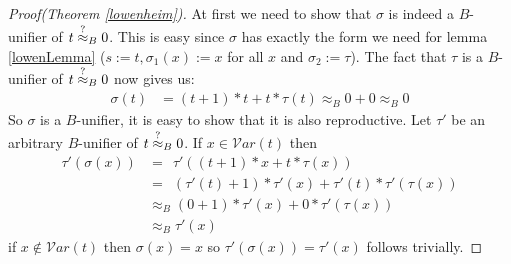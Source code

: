 		\begin{proof}[Proof(Theorem \ref{lowenheim})]
		At first we need to show that $\sigma$ is indeed a $B$-unifier of $t\stackrel{?}{\approx}_B0$. This is easy since $\sigma$ has exactly the form we need for lemma \ref{lowenLemma} ($s:=t,\sigma_1(x):=x$ for all $x$ and $\sigma_2:=\tau$). The fact that $\tau$ is a $B$-unifier of $t\stackrel{?}{\approx}_B0$ now gives us:
		\begin{align*}
		\sigma(t)&=(t+1)*t+t*\tau(t)
		\approx_B0+0
		\approx_B0
		\end{align*}
		So $\sigma$ is a $B$-unifier, it is easy to show that it is also reproductive. Let $\tau'$ be an arbitrary $B$-unifier of $t\stackrel{?}{\approx}_B0$. If $x\in\mathcal{V}ar(t)$ then
		\begin{align*}
		\tau'(\sigma(x))&=\ \ \tau'((t+1)*x+t*\tau(x))\\
		&=\ \ (\tau'(t)+1)*\tau'(x)+\tau'(t)*\tau'(\tau(x))\\
		&\approx_B(0+1)*\tau'(x)+0*\tau'(\tau(x))\\
		&\approx_B\tau'(x)
		\end{align*}
		if $x\notin\mathcal{V}ar(t)$ then $\sigma(x)=x$ so $\tau'(\sigma(x))=\tau'(x)$ follows trivially.
		\end{proof}
